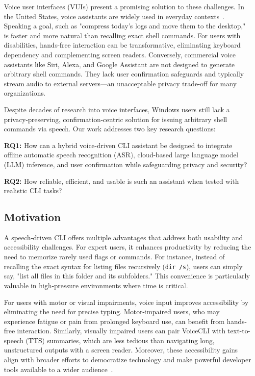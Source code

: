 \documentclass[a4paper,12pt]{article}
\begin{document}
Voice user interfaces (VUIs) present a promising solution to these challenges. In the United States, voice assistants are widely used in everyday contexts~\cite{ref8}. Speaking a goal, such as "compress today's logs and move them to the desktop," is faster and more natural than recalling exact shell commands. For users with disabilities, hands-free interaction can be transformative, eliminating keyboard dependency and complementing screen readers. Conversely, commercial voice assistants like Siri, Alexa, and Google Assistant are not designed to generate arbitrary shell commands. They lack user confirmation safeguards and typically stream audio to external servers—an unacceptable privacy trade-off for many organizations.

Despite decades of research into voice interfaces, Windows users still lack a privacy-preserving, confirmation-centric solution for issuing arbitrary shell commands via speech. Our work addresses two key research questions:
\begin{description}
    \item\textbf{RQ1:} How can a hybrid voice-driven CLI assistant be designed to integrate offline automatic speech recognition (ASR), cloud-based large language model (LLM) inference, and user confirmation while safeguarding privacy and security?

    \item\textbf{RQ2:} How reliable, efficient, and usable is such an assistant when tested with realistic CLI tasks?
\end{description}
\subsection{Motivation}

A speech-driven CLI offers multiple advantages that address both usability and accessibility challenges. For expert users, it enhances productivity by reducing the need to memorize rarely used flags or commands. For instance, instead of recalling the exact syntax for listing files recursively (\texttt{dir /s}), users can simply say, "list all files in this folder and its subfolders." This convenience is particularly valuable in high-pressure environments where time is critical.

For users with motor or visual impairments, voice input improves accessibility by eliminating the need for precise typing. Motor-impaired users, who may experience fatigue or pain from prolonged keyboard use, can benefit from hands-free interaction. Similarly, visually impaired users can pair VoiceCLI with text-to-speech (TTS) summaries, which are less tedious than navigating long, unstructured outputs with a screen reader. Moreover, these accessibility gains align with broader efforts to democratize technology and make powerful developer tools available to a wider audience~\cite{ref7}.
\end{document}
